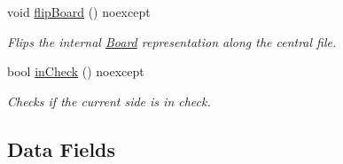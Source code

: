 \begin{DoxyCompactItemize}
void \mbox{\hyperlink{classBoard_a6007b1cc2025e26a23e63621f36fee19}{flip\+Board}} () noexcept
\begin{DoxyCompactList}\small\item\em Flips the internal \mbox{\hyperlink{classBoard}{Board}} representation along the central file. \end{DoxyCompactList}\item 
bool \mbox{\hyperlink{classBoard_a05bfcc94444986be0ae0f2ad694d629a}{in\+Check}} () noexcept
\begin{DoxyCompactList}\small\item\em Checks if the current side is in check. \end{DoxyCompactList}\end{DoxyCompactItemize}
\subsection*{Data Fields}
